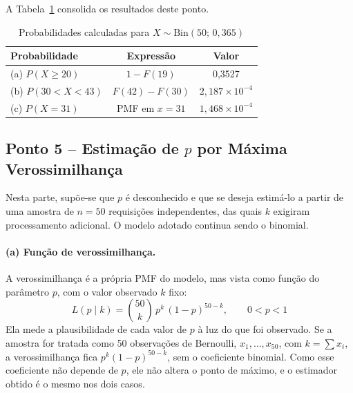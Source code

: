\documentclass[10pt,a4paper]{article}
\begin{document}
A Tabela~\ref{tab:q1-prob} consolida os resultados deste ponto.

\begin{table}[H]
\centering
\caption{Probabilidades calculadas para $X \sim \text{Bin}(50;\, 0{,}365)$}
\label{tab:q1-prob}
\begin{tabular}{lcc}
\hline
\textbf{Probabilidade} & \textbf{Expressão} & \textbf{Valor} \\
\hline
(a) $P(X \ge 20)$      & $1 - F(19)$       & 0,3527 \\
(b) $P(30 < X < 43)$   & $F(42) - F(30)$   & $2{,}187 \times 10^{-4}$ \\
(c) $P(X = 31)$        & PMF em $x = 31$   & $1{,}468 \times 10^{-4}$ \\
\hline
\end{tabular}
\end{table}

\subsection{Ponto 5 -- Estimação de $p$ por Máxima Verossimilhança}

Nesta parte, supõe-se que $p$ é desconhecido e que se deseja estimá-lo a partir de uma amostra de $n = 50$ requisições independentes, das quais $k$ exigiram processamento adicional. O modelo adotado continua sendo o binomial.

\paragraph{(a) Função de verossimilhança.} A verossimilhança é a própria PMF do modelo, mas vista como função do parâmetro $p$, com o valor observado $k$ fixo:
\[
L(p \mid k) = \binom{50}{k}\, p^{k}\, (1-p)^{50-k}, \qquad 0 < p < 1
\]
Ela mede a plausibilidade de cada valor de $p$ à luz do que foi observado. Se a amostra for tratada como 50 observações de Bernoulli, $x_1, \dots, x_{50}$, com $k = \sum x_i$, a verossimilhança fica $p^{k}(1-p)^{50-k}$, sem o coeficiente binomial. Como esse coeficiente não depende de $p$, ele não altera o ponto de máximo, e o estimador obtido é o mesmo nos dois casos.
\end{document}
